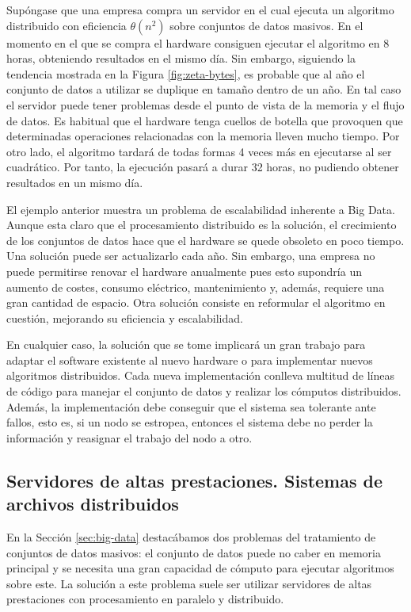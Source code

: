 \documentclass[10pt]{article}
\begin{document}
		Supóngase que una empresa compra un servidor en el cual ejecuta un algoritmo distribuido con eficiencia $\theta(n^2)$ sobre conjuntos de datos masivos. En el momento en el que se compra el hardware consiguen ejecutar el algoritmo en 8 horas, obteniendo resultados en el mismo día. Sin embargo, siguiendo la tendencia mostrada en la Figura \ref{fig:zeta-bytes}, es probable que al año el conjunto de datos a utilizar se duplique en tamaño dentro de un año. En tal caso el servidor puede tener problemas desde el punto de vista de la memoria y el flujo de datos. Es habitual que el hardware tenga cuellos de botella que provoquen que determinadas operaciones relacionadas con la memoria lleven mucho tiempo.  Por otro lado, el algoritmo tardará de todas formas 4 veces más en ejecutarse al ser cuadrático. Por tanto, la ejecución pasará a durar 32 horas, no pudiendo obtener resultados en un mismo día. 
		
		El ejemplo anterior muestra un problema de escalabilidad inherente a Big Data. Aunque esta claro que el procesamiento distribuido es la solución, el crecimiento de los conjuntos de datos hace que el hardware se quede obsoleto en poco tiempo. Una solución puede ser actualizarlo cada año. Sin embargo, una empresa no puede permitirse renovar el hardware anualmente pues esto supondría un aumento de costes, consumo eléctrico, mantenimiento y, además, requiere una gran cantidad de espacio. Otra solución consiste en reformular el algoritmo en cuestión, mejorando su eficiencia y escalabilidad.
		
		En cualquier caso, la solución que se tome implicará un gran trabajo para adaptar el software existente al nuevo hardware o para implementar nuevos algoritmos distribuidos. Cada nueva implementación conlleva multitud de líneas de código para manejar el conjunto de datos y realizar los cómputos distribuidos. Además, la implementación debe conseguir que el sistema sea tolerante ante fallos, esto es, si un nodo se estropea, entonces el sistema debe no perder la información y reasignar el trabajo del nodo a otro.

	\subsection{Servidores de altas prestaciones. Sistemas de archivos distribuidos} \label{sec:mr-hadoop:servidores}

		En la Sección \ref{sec:big-data} destacábamos dos problemas del tratamiento de conjuntos de datos masivos: el conjunto de datos puede no caber en memoria principal y se necesita una gran capacidad de cómputo para ejecutar algoritmos sobre este. La solución a este problema suele ser utilizar servidores de altas prestaciones con procesamiento en paralelo y distribuido.
	
\end{document}
